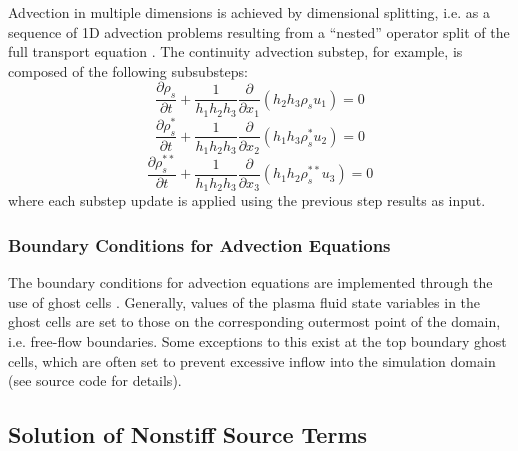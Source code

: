 \documentclass[11pt,letterpaper]{article}
\begin{document}
Advection in multiple dimensions is achieved by dimensional splitting, i.e. as a sequence of 1D advection problems resulting from a ``nested'' operator split of the full transport equation .  The continuity advection substep, for example, is composed of the following subsubsteps:
\begin{equation}
\frac{\partial \rho_s}{\partial t} + \frac{1}{h_1 h_2 h_3} \frac{\partial}{\partial x_1} \left( h_2 h_3 \rho_s u_1 \right)  = 0
\end{equation}
\begin{equation}
\frac{\partial \rho_s^*}{\partial t} + \frac{1}{h_1 h_2 h_3} \frac{\partial}{\partial x_2} \left( h_1 h_3 \rho_s^* u_2 \right)  = 0
\end{equation}
\begin{equation}
\frac{\partial \rho_s^{**}}{\partial t} + \frac{1}{h_1 h_2 h_3} \frac{\partial}{\partial x_3} \left( h_1 h_2 \rho_s^{**} u_3 \right) = 0
\end{equation}
where each substep update is applied using the previous step results as input.


\subsubsection{Boundary Conditions for Advection Equations}

The boundary conditions for advection equations are implemented through the use of ghost cells \citep{Leveque:2002}.  Generally, values of the plasma fluid state variables in the ghost cells are set to those on the corresponding outermost point of the domain, i.e. free-flow boundaries.  Some exceptions to this exist at the top boundary ghost cells, which are often set to prevent excessive inflow into the simulation domain (see source code for details).  

\subsection{Solution of Nonstiff Source Terms} \label{sec:numnonstiff}
\end{document}
